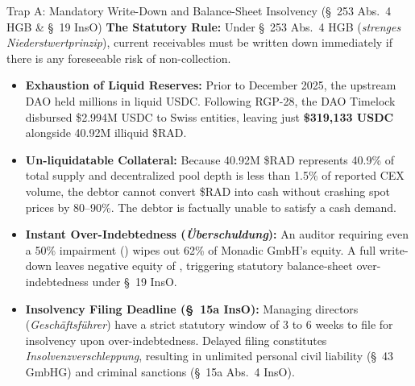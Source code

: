 \documentclass[a4paper,11pt,twoside,parskip=half-,headings=small]{scrartcl}
\begin{document}
\begin{warnbox}{Trap A: Mandatory Write-Down and Balance-Sheet Insolvency (\S~253 Abs.~4 HGB \& \S~19 InsO)}
\textbf{The Statutory Rule:} Under \S~253 Abs.~4 HGB (\emph{strenges Niederstwertprinzip}), current receivables must be written down immediately if there is any foreseeable risk of non-collection.
\begin{itemize}[nosep]
  \item \textbf{Exhaustion of Liquid Reserves:} Prior to December 2025, the upstream DAO held millions in liquid USDC. Following RGP-28, the DAO Timelock disbursed \$2.994M USDC to Swiss entities, leaving just \textbf{\$319,133 USDC} alongside 40.92M illiquid \$RAD.
  \item \textbf{Un-liquidatable Collateral:} Because 40.92M \$RAD represents 40.9\% of total supply and decentralized pool depth is less than 1.5\% of reported CEX volume, the debtor cannot convert \$RAD into cash without crashing spot prices by 80--90\%. The debtor is factually unable to satisfy a  cash demand.
  \item \textbf{Instant Over-Indebtedness (\emph{Überschuldung}):} An auditor requiring even a 50\% impairment () wipes out 62\% of Monadic GmbH's  equity. A full write-down leaves negative equity of , triggering statutory balance-sheet over-indebtedness under \S~19 InsO.
  \item \textbf{Insolvency Filing Deadline (\S~15a InsO):} Managing directors (\emph{Geschäftsführer}) have a strict statutory window of 3 to 6 weeks to file for insolvency upon over-indebtedness. Delayed filing constitutes \emph{Insolvenzverschleppung}, resulting in unlimited personal civil liability (\S~43 GmbHG) and criminal sanctions (\S~15a Abs.~4 InsO).
\end{itemize}
\end{warnbox}
\end{document}
